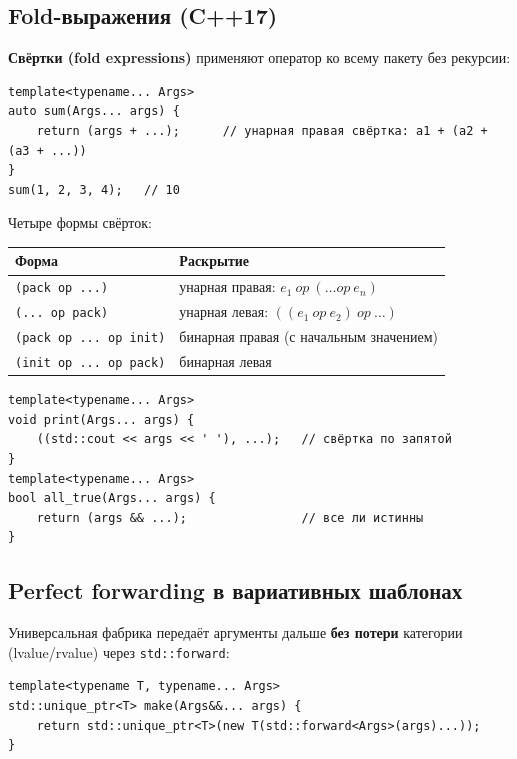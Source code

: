 \subsection{Fold-выражения (C++17)}

\textbf{Свёртки (fold expressions)} применяют оператор ко всему пакету без
рекурсии:

\begin{lstlisting}
template<typename... Args>
auto sum(Args... args) {
    return (args + ...);      // унарная правая свёртка: a1 + (a2 + (a3 + ...))
}
sum(1, 2, 3, 4);   // 10
\end{lstlisting}

Четыре формы свёрток:

\begin{center}
\begin{tabular}{ll}
\toprule
\textbf{Форма} & \textbf{Раскрытие} \\
\midrule
\texttt{(pack op ...)}          & унарная правая: $e_1\ op\ (\dots op\ e_n)$ \\
\texttt{(... op pack)}          & унарная левая:  $((e_1\ op\ e_2)\ op\ \dots)$ \\
\texttt{(pack op ... op init)}  & бинарная правая (с начальным значением) \\
\texttt{(init op ... op pack)}  & бинарная левая \\
\bottomrule
\end{tabular}
\end{center}

\begin{lstlisting}
template<typename... Args>
void print(Args... args) {
    ((std::cout << args << ' '), ...);   // свёртка по запятой
}
template<typename... Args>
bool all_true(Args... args) {
    return (args && ...);                // все ли истинны
}
\end{lstlisting}

\subsection{Perfect forwarding в вариативных шаблонах}

Универсальная фабрика передаёт аргументы дальше \textbf{без потери} категории
(lvalue/rvalue) через \texttt{std::forward}:

\begin{lstlisting}
template<typename T, typename... Args>
std::unique_ptr<T> make(Args&&... args) {
    return std::unique_ptr<T>(new T(std::forward<Args>(args)...));
}
\end{lstlisting}

